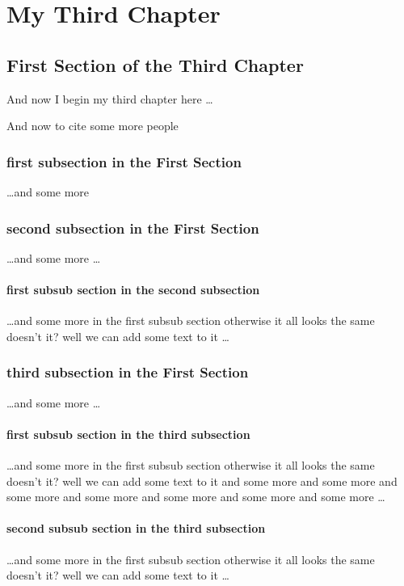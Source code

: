 \chapter{My Third Chapter}

\section{First Section of the Third Chapter}
And now I begin my third chapter here \dots

And now to cite some more people~\citet{Rea85}

\subsection{first subsection in the First Section}
\dots and some more 

\subsection{second subsection in the First Section}
\dots and some more \dots

\subsubsection{first subsub section in the second subsection}
\dots and some more in the first subsub section otherwise it all looks the same
doesn't it? well we can add some text to it \dots

\subsection{third subsection in the First Section}
\dots and some more \dots

\subsubsection{first subsub section in the third subsection}
\dots and some more in the first subsub section otherwise it all looks the same
doesn't it? well we can add some text to it and some more and some more and
some more and some more and some more and some more and some more \dots

\subsubsection{second subsub section in the third subsection}
\dots and some more in the first subsub section otherwise it all looks the same
doesn't it? well we can add some text to it \dots


